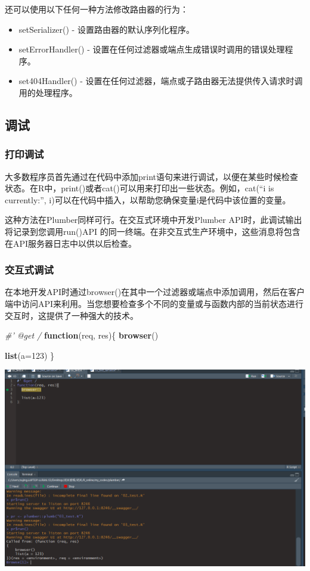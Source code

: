 \documentclass[]{book}
\newenvironment{Shaded}{\begin{snugshade}}{\end{snugshade}}
\newcommand{\KeywordTok}[1]{\textcolor[rgb]{0.13,0.29,0.53}{\textbf{#1}}}
\newcommand{\DataTypeTok}[1]{\textcolor[rgb]{0.13,0.29,0.53}{#1}}
\newcommand{\DecValTok}[1]{\textcolor[rgb]{0.00,0.00,0.81}{#1}}
\newcommand{\CommentTok}[1]{\textcolor[rgb]{0.56,0.35,0.01}{\textit{#1}}}
\newcommand{\ControlFlowTok}[1]{\textcolor[rgb]{0.13,0.29,0.53}{\textbf{#1}}}
\newcommand{\NormalTok}[1]{#1}
\providecommand{\tightlist}{%
  \setlength{\itemsep}{0pt}\setlength{\parskip}{0pt}}
\begin{document}
还可以使用以下任何一种方法修改路由器的行为：

\begin{itemize}
\tightlist
\item
  setSerializer() - 设置路由器的默认序列化程序。
\item
  setErrorHandler() -
  设置在任何过滤器或端点生成错误时调用的错误处理程序。
\item
  set404Handler() -
  设置在任何过滤器，端点或子路由器无法提供传入请求时调用的处理程序。
\end{itemize}

\subsection{调试}

\subsubsection{打印调试}

大多数程序员首先通过在代码中添加print语句来进行调试，以便在某些时候检查状态。在R中，print()或者cat()可以用来打印出一些状态。例如，cat(``i
is currently:'',
i)可以在代码中插入，以帮助您确保变量i是代码中该位置的变量。

这种方法在Plumber同样可行。在交互式环境中开发Plumber
API时，此调试输出将记录到您调用run()API
的同一终端。在非交互式生产环境中，这些消息将包含在API服务器日志中以供以后检查。

\subsubsection{交互式调试}

在本地开发API时通过browser()在其中一个过滤器或端点中添加调用，然后在客户端中访问API来利用。当您想要检查多个不同的变量或与函数内部的当前状态进行交互时，这提供了一种强大的技术。

\begin{Shaded}
\begin{Highlighting}[]
\CommentTok{#' @get /}
\ControlFlowTok{function}\NormalTok{(req, res)\{}
  \KeywordTok{browser}\NormalTok{()}
  
  \KeywordTok{list}\NormalTok{(}\DataTypeTok{a=}\DecValTok{123}\NormalTok{)}
\NormalTok{\}}
\end{Highlighting}
\end{Shaded}

\includegraphics{pic/plumber/p6.png}
\end{document}
